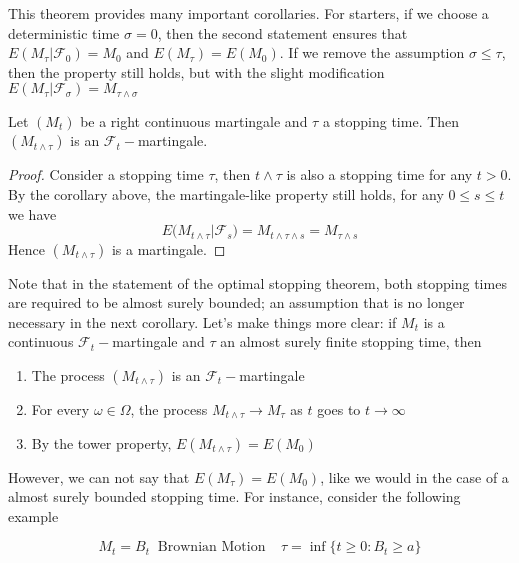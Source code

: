 This theorem provides many important corollaries. For starters, if we choose a deterministic time $\sigma = 0$, then the second statement ensures that $E(M_{\tau} \vert \mathcal{F}_0) = M_0$ and $E(M_{\tau}) = E(M_0)$. If we remove the assumption $\sigma \leq \tau$, then the property still holds, but with the slight modification $E(M_{\tau} \vert \mathcal{F}_{\sigma}) = M_{\tau \wedge \sigma}$

\begin{corollary}
    Let $(M_t)$ be a right continuous martingale and $\tau$ a stopping time. Then $(M_{t \wedge \tau})$ is an $\mathcal{F}_t-$martingale.  
\end{corollary}
\begin{proof}
    Consider a stopping time $\tau$, then $t \wedge \tau$ is also a stopping time for any $t > 0$. By the corollary above, the martingale-like property still holds, for any $0 \leq s \leq t$ we have 
    \begin{equation*}
        E\big(M_{t \wedge \tau} \vert \mathcal{F}_s \big) = M_{t \wedge \tau \wedge s} = M_{\tau \wedge s}
    \end{equation*}
    Hence $(M_{t \wedge \tau})$ is a martingale. 
\end{proof}

Note that in the statement of the optimal stopping theorem, both stopping times are required to be almost surely bounded; an assumption that is no longer necessary in the next corollary. Let's make things more clear: if $M_t$ is a continuous $\mathcal{F}_t-$martingale and $\tau$ an almost surely finite stopping time, then
\begin{enumerate}
    \item The process $(M_{t \wedge \tau})$ is an $\mathcal{F}_t-$martingale
    \item For every $\omega \in \Omega$, the process $M_{t \wedge \tau} \to M_{\tau}$ as $t$ goes to $t \to \infty$
    \item By the tower property, $E(M_{t \wedge \tau} ) = E(M_0)$
\end{enumerate}

However, we can not say that $E(M_{\tau}) = E(M_0)$, like we would in the case of a almost surely bounded stopping time. For instance, consider the following example

\begin{equation*}
    M_t = B_t \;\; \text{Brownian Motion} \;\;\;\; \tau = \inf\big\{ t \geq 0 : B_t \geq a\big\}
\end{equation*}


